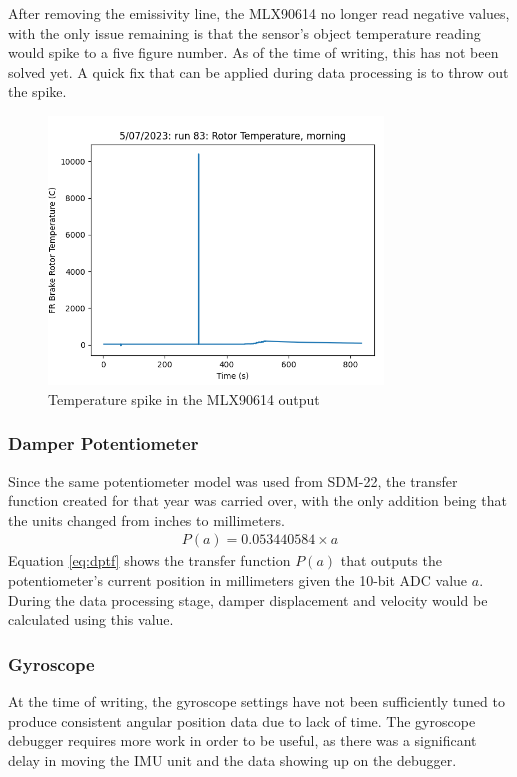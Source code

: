After removing the emissivity line, the MLX90614 no longer read negative values, with the only issue remaining is that the sensor's object temperature reading would spike to a five figure number.
As of the time of writing, this has not been solved yet.
A quick fix that can be applied during data processing is to throw out the spike.
\begin{figure}[H]
    \centering
    \includegraphics[width=3.5in]{images/hot.png}
    \caption{Temperature spike in the MLX90614 output}
    \label{fig:hot}
\end{figure}
\subsubsection{Damper Potentiometer}
Since the same potentiometer model was used from SDM-22, the transfer function created for that year was carried over, with the only addition being that the units changed from inches to millimeters.
\begin{gather}\label{eq:dptf}
    P(a) =  0.053440584\times a
\end{gather}
Equation \ref{eq:dptf} shows the transfer function $P(a)$ that outputs the potentiometer's current position in millimeters given the 10-bit ADC value $a$.
During the data processing stage, damper displacement and velocity would be calculated using this value.
\subsubsection{Gyroscope}
At the time of writing, the gyroscope settings have not been sufficiently tuned to produce consistent angular position data due to lack of time.
The gyroscope debugger requires more work in order to be useful, as there was a significant delay in moving the IMU unit and the data showing up on the debugger.
\vspace{1em}

